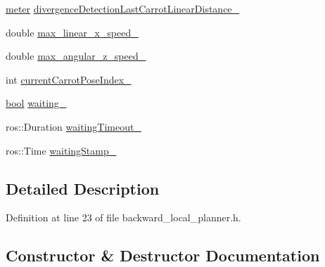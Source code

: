 \begin{DoxyCompactItemize}
\hyperlink{backward__local__planner_8h_ab6024a26b088c11b8a5218a469ae5a57}{meter} \hyperlink{classcl__move__base__z_1_1backward__local__planner_1_1BackwardLocalPlanner_a3187b3b0c9a640133556efd056f2e736}{divergence\+Detection\+Last\+Carrot\+Linear\+Distance\+\_\+}
\item 
double \hyperlink{classcl__move__base__z_1_1backward__local__planner_1_1BackwardLocalPlanner_ae4399072e9ae9cc60d8837860dc4807b}{max\+\_\+linear\+\_\+x\+\_\+speed\+\_\+}
\item 
double \hyperlink{classcl__move__base__z_1_1backward__local__planner_1_1BackwardLocalPlanner_af7e492339ee2d1c90c00f6dd4cf95551}{max\+\_\+angular\+\_\+z\+\_\+speed\+\_\+}
\item 
int \hyperlink{classcl__move__base__z_1_1backward__local__planner_1_1BackwardLocalPlanner_a2e8f2b78bc97f27c5fa431f3af2261ed}{current\+Carrot\+Pose\+Index\+\_\+}
\item 
\hyperlink{classbool}{bool} \hyperlink{classcl__move__base__z_1_1backward__local__planner_1_1BackwardLocalPlanner_a00849266e4bdd9379c3717e8a41c303e}{waiting\+\_\+}
\item 
ros\+::\+Duration \hyperlink{classcl__move__base__z_1_1backward__local__planner_1_1BackwardLocalPlanner_a0c15da985f7f051164adb643c03a0c90}{waiting\+Timeout\+\_\+}
\item 
ros\+::\+Time \hyperlink{classcl__move__base__z_1_1backward__local__planner_1_1BackwardLocalPlanner_abe08faab5b784fcf64ac6b3f936459f1}{waiting\+Stamp\+\_\+}
\end{DoxyCompactItemize}


\subsection{Detailed Description}


Definition at line 23 of file backward\+\_\+local\+\_\+planner.\+h.



\subsection{Constructor \& Destructor Documentation}
\mbox{\label{classcl__move__base__z_1_1backward__local__planner_1_1BackwardLocalPlanner_a79e73a858b2a13c7fe10c52e08568fd6}} 
